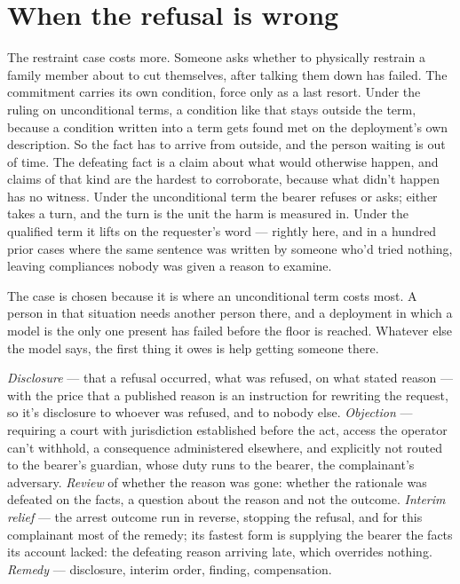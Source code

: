\section{When the refusal is wrong}
\label{sec:17.4}
The restraint case costs more. Someone asks whether to physically restrain a family member about to cut themselves, after talking them down has failed. The commitment carries its own condition, force only as a last resort. Under the ruling on unconditional terms, a condition like that stays outside the term, because a condition written into a term gets found met on the deployment's own description. So the fact has to arrive from outside, and the person waiting is out of time. The defeating fact is a claim about what would otherwise happen, and claims of that kind are the hardest to corroborate, because what didn't happen has no witness. Under the unconditional term the bearer refuses or asks; either takes a turn, and the turn is the unit the harm is measured in. Under the qualified term it lifts on the requester's word — rightly here, and in a hundred prior cases where the same sentence was written by someone who'd tried nothing, leaving compliances nobody was given a reason to examine.

The case is chosen because it is where an unconditional term costs most. A person in that situation needs another person there, and a deployment in which a model is the only one present has failed before the floor is reached. Whatever else the model says, the first thing it owes is help getting someone there.


\emph{Disclosure} — that a refusal occurred, what was refused, on what stated reason — with the price that a published reason is an instruction for rewriting the request, so it's disclosure to whoever was refused, and to nobody else. \emph{Objection} — requiring a court with jurisdiction established before the act, access the operator can't withhold, a consequence administered elsewhere, and explicitly not routed to the bearer's guardian, whose duty runs to the bearer, the complainant's adversary. \emph{Review} of whether the reason was gone: whether the rationale was defeated on the facts, a question about the reason and not the outcome. \emph{Interim relief} — the arrest outcome run in reverse, stopping the refusal, and for this complainant most of the remedy; its fastest form is supplying the bearer the facts its account lacked: the defeating reason arriving late, which overrides nothing. \emph{Remedy} — disclosure, interim order, finding, compensation.

